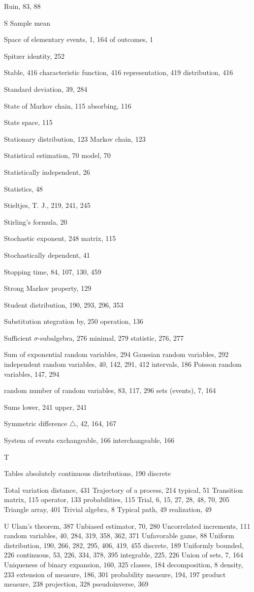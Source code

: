 Ruin, 83, 88

S
Sample mean

Space
of elementary events, 1, 164
of outcomes, 1

Spitzer identity, 252

Stable, 416
characteristic function, 416
representation, 419
distribution, 416

Standard deviation, 39, 284

State of Markov chain, 115
absorbing, 116

State space, 115

Stationary
distribution, 123
Markov chain, 123

Statistical
estimation, 70
model, 70

Statistically independent, 26

Statistics, 48

Stieltjes, T. J., 219, 241, 245

Stirling’s formula, 20

Stochastic
exponent, 248
matrix, 115

Stochastically dependent, 41

Stopping time, 84, 107, 130, 459

Strong Markov property, 129

Student distribution, 190, 293, 296, 353

Substitution
ntegration by, 250
operation, 136

Sufficient
$\sigma$-subalgebra, 276
minimal, 279
statistic, 276, 277

Sum of
exponential random variables, 294
Gaussian random variables, 292
independent random variables, 40,
142, 291, 412
intervals, 186
Poisson random variables, 147,
294

random number of random
variables, 83, 117, 296
sets (events), 7, 164

Sums
lower, 241
upper, 241

Symmetric difference $\triangle$, 42, 164, 167

System of events
exchangeable, 166
interchangeable, 166

T

Tables
absolutely continuous
distributions, 190
discrete

Total variation distance, 431
Trajectory
of a process, 214
typical, 51
Transition
matrix, 115
operator, 133
probabilities, 115
Trial, 6, 15, 27, 28, 48, 70, 205
Triangle array, 401
Trivial algebra, 8
Typical
path, 49
realization, 49

U
Ulam’s theorem, 387
Unbiased estimator, 70, 280
Uncorrelated
increments, 111
random variables, 40, 284, 319, 358, 362, 371
Unfavorable game, 88
Uniform distribution, 190, 266, 282, 295, 406, 419, 455
discrete, 189
Uniformly
bounded, 226
continuous, 53, 226, 334, 378, 395
integrable, 225, 226
Union of sets, 7, 164
Uniqueness of
binary expansion, 160, 325
classes, 184
decomposition, 8
density, 233
extension of measure, 186, 301
probability measure, 194, 197
product measure, 238
projection, 328
pseudoinverse, 369

